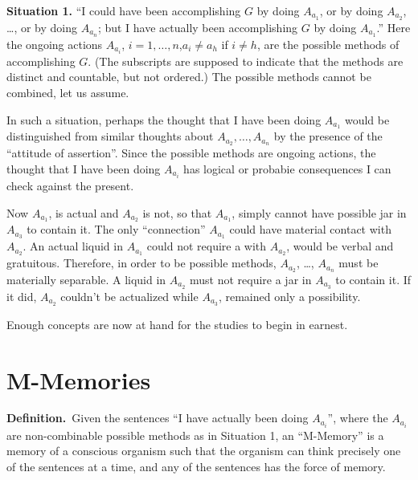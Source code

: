 \begin{hangers}
\textbf{Situation 1.} \enquote{I could have been accomplishing $G$ by doing $A_{a_1}$, or by 
doing $A_{a_2}$, \ldots, or by doing $A_{a_n}$; but I have actually been accomplishing $G$ by 
doing $A_{a_1}$.} Here the ongoing actions $A_{a_i}$, $i=1,\ldots,n$,$a_i\neq a_h$ if $i\neq h$, are 
the possible methods of accomplishing $G$. (The subscripts are supposed to 
indicate that the methods are distinct and countable, but not ordered.) The 
possible methods cannot be combined, let us assume. 
\end{hangers}

In such a situation, perhaps the thought that I have been doing $A_{a_1}$
would be distinguished from similar thoughts about $A_{a_2}, \ldots, A_{a_n}$ by the
presence of the \enquote{attitude of assertion}. Since the possible methods are 
ongoing actions, the thought that I have been doing $A_{a_i}$ has logical or 
probabie consequences I can check against the present. 

Now $A_{a_1}$, is actual and $A_{a_2}$ is not, so that $A_{a_1}$, simply cannot have 
possible jar in $A_{a_3}$ to contain it. The only \enquote{connection} $A_{a_1}$ could have
material contact with $A_{a_2}$. An actual liquid in $A_{a_1}$ could not require a 
with $A_{a_2}$, would be verbal and gratuitous. Therefore, in order to be possible 
methods, $A_{a_2}$, \ldots, $A_{a_n}$ must be materially separable. A liquid in $A_{a_2}$ must
not require a jar in $A_{a_3}$ to contain it. If it did, $A_{a_2}$ couldn't be actualized 
while $A_{a_3}$, remained only a possibility. 

Enough concepts are now at hand for the studies to begin in earnest. 

\section{M-Memories}

\newcommand{\definition}{\textbf{Definition.}}
\newcommand{\assumption}[1]{\textit{Assumption #1.}}
\newcommand{\conclusion}[1]{\textbf{Conclusion #1.}}

\begin{hangers}
\definition\ Given the sentences \enquote{I have actually been doing $A_{a_i}$}, where 
the $A_{a_i}$ are non-combinable possible methods as in Situation 1, an 
\enquote{M-Memory} is a memory of a conscious organism such that the organism 
can think precisely one of the sentences at a time, and any of the sentences 
has the force of memory. 
\end{hangers}

